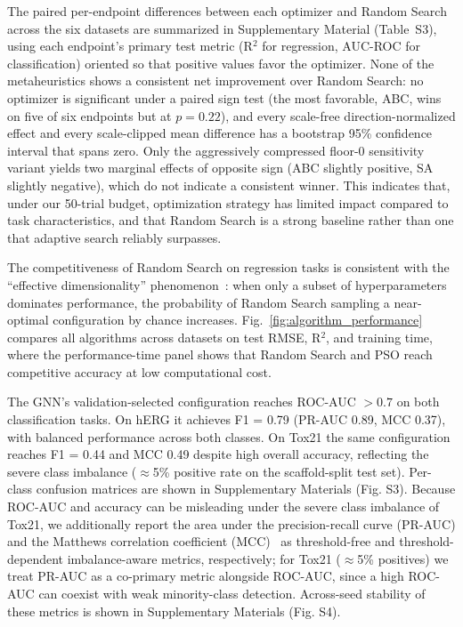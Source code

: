 \documentclass[journal]{IEEEtran}
\begin{document}
The paired per-endpoint differences between each optimizer and Random Search across the six datasets are summarized in Supplementary Material (Table~S3), using each endpoint's primary test metric (R$^2$ for regression, AUC-ROC for classification) oriented so that positive values favor the optimizer. None of the metaheuristics shows a consistent net improvement over Random Search: no optimizer is significant under a paired sign test (the most favorable, ABC, wins on five of six endpoints but at $p=0.22$), and every scale-free direction-normalized effect and every scale-clipped mean difference has a bootstrap 95\% confidence interval that spans zero. Only the aggressively compressed floor-$0$ sensitivity variant yields two marginal effects of opposite sign (ABC slightly positive, SA slightly negative), which do not indicate a consistent winner. This indicates that, under our 50-trial budget, optimization strategy has limited impact compared to task characteristics, and that Random Search is a strong baseline rather than one that adaptive search reliably surpasses.

The competitiveness of Random Search on regression tasks is consistent with the ``effective dimensionality'' phenomenon~\cite{bergstra2012random}: when only a subset of hyperparameters dominates performance, the probability of Random Search sampling a near-optimal configuration by chance increases. Fig.~\ref{fig:algorithm_performance} compares all algorithms across datasets on test RMSE, R$^2$, and training time, where the performance-time panel shows that Random Search and PSO reach competitive accuracy at low computational cost.

The GNN's validation-selected configuration reaches ROC-AUC $>0.7$ on both classification tasks. On hERG it achieves F1 = 0.79 (PR-AUC 0.89, MCC 0.37), with balanced performance across both classes. On Tox21 the same configuration reaches F1 = 0.44 and MCC 0.49 despite high overall accuracy, reflecting the severe class imbalance ($\approx$5\% positive rate on the scaffold-split test set). Per-class confusion matrices are shown in Supplementary Materials (Fig. S3). Because ROC-AUC and accuracy can be misleading under the severe class imbalance of Tox21, we additionally report the area under the precision-recall curve (PR-AUC) and the Matthews correlation coefficient (MCC)~\cite{chicco2020mcc} as threshold-free and threshold-dependent imbalance-aware metrics, respectively; for Tox21 ($\approx$5\% positives) we treat PR-AUC as a co-primary metric alongside ROC-AUC, since a high ROC-AUC can coexist with weak minority-class detection. Across-seed stability of these metrics is shown in Supplementary Materials (Fig. S4).
\end{document}
